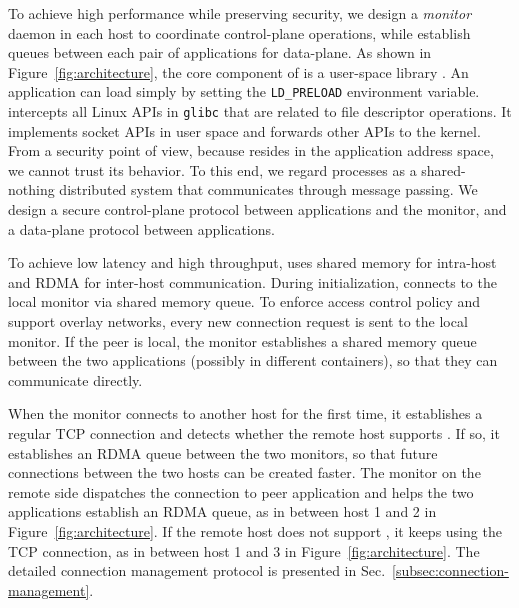 To achieve high performance while preserving security, we design a \emph{monitor} daemon in each host to coordinate control-plane operations, while establish queues between each pair of applications for data-plane.
As shown in Figure~\ref{fig:architecture}, the core component of \sys{} is a user-space library \libipc{}.
An application can load \libipc{} simply by setting the \texttt{LD\_PRELOAD} environment variable.
\libipc{} intercepts all Linux APIs in \texttt{glibc} that are related to file descriptor operations.
It implements socket APIs in user space and forwards other APIs to the kernel.
From a security point of view, because \libipc{} resides in the application address space, we cannot trust its behavior.
To this end, we regard processes as a shared-nothing distributed system that communicates through message passing.
We design a secure control-plane protocol between applications and the monitor, and a data-plane protocol between applications.

To achieve low latency and high throughput, \sys{} uses shared memory for intra-host and RDMA for inter-host communication.
During initialization, \libipc{} connects to the local monitor via shared memory queue.
To enforce access control policy and support overlay networks, %
every new connection request is sent to the local monitor.
If the peer is local, the monitor establishes a shared memory queue between the two applications (possibly in different containers), so that they can communicate directly.

When the monitor connects to another host for the first time, it establishes a regular TCP connection and detects whether the remote host supports \sys{}.
If so, it establishes an RDMA queue between the two monitors, so that future connections between the two hosts can be created faster.
The monitor on the remote side dispatches the connection to peer application and helps the two applications establish an RDMA queue, as in between host 1 and 2 in Figure~\ref{fig:architecture}.
If the remote host does not support \sys{}, it keeps using the TCP connection, as in between host 1 and 3 in Figure~\ref{fig:architecture}.
The detailed connection management protocol is presented in Sec.~\ref{subsec:connection-management}.

